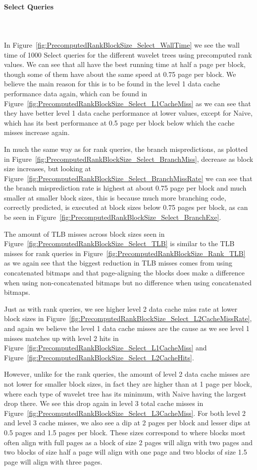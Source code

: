 \paragraph{Select Queries}~\\\\
In Figure~\ref{fig:PrecomputedRankBlockSize_Select_WallTime} we see the wall time of 1000 Select queries for the different wavelet trees using precomputed rank values.
We can see that all have the best running time at half a page per block, though some of them have about the same speed at 0.75 page per block.
We believe the main reason for this is to be found in the level 1 data cache performance data again, which can be found in Figure~\ref{fig:PrecomputedRankBlockSize_Select_L1CacheMiss} as we can see that they have better level 1 data cache performance at lower values, except for Naive, which has its best performance at 0.5 page per block below which the cache misses increase again.

In much the same way as for rank queries, the branch mispredictions, as plotted in Figure~\ref{fig:PrecomputedRankBlockSize_Select_BranchMiss}, decrease as block size increases, but looking at Figure~\ref{fig:PrecomputedRankBlockSize_Select_BranchMissRate} we can see that the branch misprediction rate is highest at about 0.75 page per block and much smaller at smaller block sizes, this is because much more branching code, correctly predicted, is executed at block sizes below 0.75 pages per block, as can be seen in Figure~\ref{fig:PrecomputedRankBlockSize_Select_BranchExe}.

The amount of TLB misses across block sizes seen in Figure~\ref{fig:PrecomputedRankBlockSize_Select_TLB} is similar to the TLB misses for rank queries in Figure~\ref{fig:PrecomputedRankBlockSize_Rank_TLB} as we again see that the biggest reduction in TLB misses comes from using concatenated bitmaps and that page-aligning the blocks does make a difference when using non-concatenated bitmaps but no difference when using concatenated bitmaps.

Just as with rank queries, we see higher level 2 data cache miss rate at lower block sizes in Figure~\ref{fig:PrecomputedRankBlockSize_Select_L2CacheMissRate}, and again we believe the level 1 data cache misses are the cause as we see level 1 misses matches up with level 2 hits in Figure~\ref{fig:PrecomputedRankBlockSize_Select_L1CacheMiss} and Figure~\ref{fig:PrecomputedRankBlockSize_Select_L2CacheHits}.

However, unlike for the rank queries, the amount of level 2 data cache misses are not lower for smaller block sizes, in fact they are higher than at 1 page per block, where each type of wavelet tree has its minimum, with Naive having the largest drop there.
We see this drop again in level 3 total cache misses in Figure~\ref{fig:PrecomputedRankBlockSize_Select_L3CacheMiss}.
For both level 2 and level 3 cache misses, we also see a dip at 2 pages per block and lesser dips at 0.5 pages and 1.5 pages per block. 
These sizes correspond to where blocks most often align with full pages as a block of size 2 pages will align with two pages and two blocks of size half a page will align with one page and two blocks of size 1.5 page will align with three pages.

